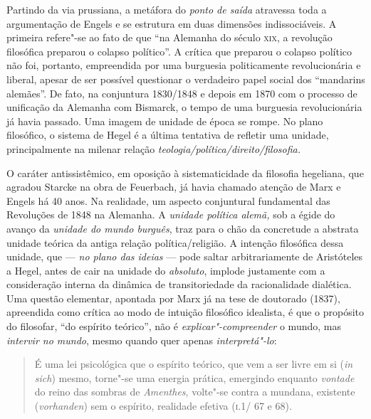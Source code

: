 Partindo da via prussiana, a metáfora do \emph{ponto de saída} atravessa
toda a argumentação de Engels e se estrutura em duas dimensões
indissociáveis. A primeira refere"-se ao fato de que ``na Alemanha do
século \textsc{xix}, a revolução filosófica preparou o colapso
político''. A crítica que preparou o colapso político não foi, portanto,
empreendida por uma burguesia politicamente revolucionária e liberal,
apesar de ser possível questionar o verdadeiro papel social dos
``mandarins alemães''. De fato, na conjuntura 1830/1848 e depois em 1870
com o processo de unificação da Alemanha com Bismarck, o tempo de uma
burguesia revolucionária já havia passado. Uma imagem de unidade de
época se rompe. No plano filosófico, o sistema de Hegel é a última
tentativa de refletir uma unidade, principalmente na milenar relação
\emph{teologia/política/direito/filosofia.}

O caráter antissistêmico, em oposição à sistematicidade da filosofia
hegeliana, que agradou Starcke na obra de Feuerbach, já havia chamado
atenção de Marx e Engels há 40 anos. Na realidade, um aspecto
conjuntural fundamental das Revoluções de 1848 na Alemanha. A
\emph{unidade política alemã,} sob a égide do avanço da \emph{unidade do
mundo burguês}, traz para o chão da concretude a abstrata unidade
teórica da antiga relação política/religião. A intenção filosófica dessa
unidade, que --- \emph{no plano das ideias} --- pode saltar
arbitrariamente de Aristóteles a Hegel, antes de cair na unidade do
\emph{absoluto}, implode justamente com a consideração interna da
dinâmica de transitoriedade da racionalidade dialética. Uma questão
elementar, apontada por Marx já na tese de doutorado (1837), apreendida
como crítica ao modo de intuição filosófico idealista, é que o propósito
do filosofar, ``do espírito teórico'', não é
\emph{explicar"-compreender} o mundo, mas \emph{intervir no mundo},
mesmo quando quer apenas \emph{interpretá"-lo}:

\begin{quote}
É uma lei psicológica que o espírito teórico, que vem a ser livre em
si (\emph{in sich}) mesmo, torne"-se uma energia prática, emergindo
enquanto \emph{vontade} do reino das sombras de \emph{Amenthes},
volte"-se contra a mundana, existente (\emph{vorhanden}) sem o
espírito, realidade efetiva (\textsc{i}.1/ 67 e 68).
\end{quote}

